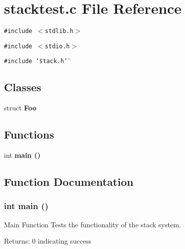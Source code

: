\section{stacktest.c File Reference}
\label{stacktest_8c}
{\tt \#include $<$stdlib.h$>$}\par
{\tt \#include $<$stdio.h$>$}\par
{\tt \#include \char`\"{}stack.h\char`\"{}}\par
\subsection*{Classes}
\begin{CompactItemize}
\item 
struct \bf{Foo}
\end{CompactItemize}
\subsection*{Functions}
\begin{CompactItemize}
\item 
int \bf{main} ()
\end{CompactItemize}


\subsection{Function Documentation}
\subsubsection{\setlength{\rightskip}{0pt plus 5cm}int main ()}\label{stacktest_8c_446c6b9a1a4dbab517fbb760870458a3}


Main Function Tests the functionality of the stack system. \begin{Desc}
\item[Returns:]0 indicating success \end{Desc}
